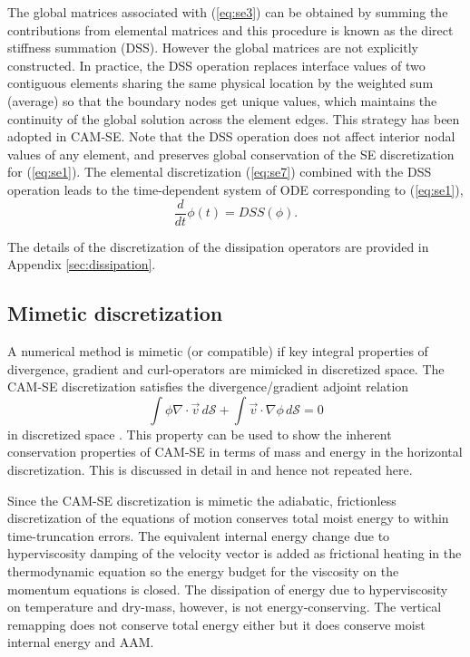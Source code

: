 \documentclass{agujournal}
\begin{document}
{  The  global matrices associated with  (\ref{eq:se3}) can be obtained 
  by  summing the contributions from elemental matrices  and  this procedure is known as the 
  direct stiffness summation (DSS). However the global matrices are  not explicitly constructed. 
  In practice, the DSS operation replaces  interface values  of two  contiguous elements sharing the same physical location  
  by the  weighted sum (average)  so that  the boundary  nodes get unique values,   
   which maintains the continuity of the global solution across the element edges. This strategy has been adopted in CAM-SE. 
  Note that the DSS operation does not affect interior nodal values of any element, and  preserves global conservation of the SE discretization
  for (\ref{eq:se1}).  The elemental discretization (\ref{eq:se7}) combined with the  DSS operation  leads 
  to the time-dependent  system of ODE corresponding to (\ref{eq:se1}),
     \begin{equation}
  \frac{d }{dt} \phi(t) =   DSS(\phi).  \label{eq:se8}
       \end{equation}

The details of the discretization of the dissipation operators are provided in Appendix \ref{sec:dissipation}.
%
\subsection{Mimetic discretization}
A numerical method is mimetic (or compatible) if key integral properties of divergence, gradient and curl-operators are mimicked in discretized space. The CAM-SE discretization satisfies the divergence/gradient adjoint relation
\begin{equation}
\int \phi \nabla \cdot \vec{v} \, d\mathcal{S}+\int \vec{v} \cdot \nabla \phi \, d\mathcal{S}=0
\end{equation}
in  discretized space \citep{TF2010JCP}. This property can be used to show the inherent conservation properties of CAM-SE in terms of mass and energy in the horizontal discretization. This is discussed in detail in \cite{T2011LNCSEb} and hence not repeated here. 

Since the CAM-SE discretization is mimetic the adiabatic, frictionless discretization of the equations of motion conserves total moist energy to within time-truncation errors. The equivalent internal energy change due to hyperviscosity damping of the velocity vector is added as frictional heating in the thermodynamic equation so the energy budget for the viscosity on the momentum equations is closed. The dissipation of energy due to hyperviscosity on temperature and dry-mass, however, is not energy-conserving. The vertical remapping does not conserve total energy either but it does conserve moist internal energy and AAM.


}
\end{document}
